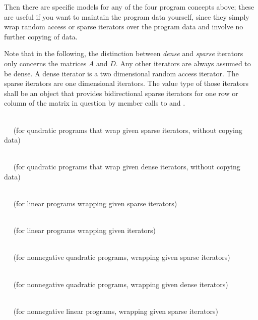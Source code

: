 Then there are specific models for any of the four program concepts above; 
these are useful if you want to maintain the program data yourself, since
they simply wrap random access or sparse iterators over the program data and involve
no further copying of data.

Note that in the following, the distinction between \emph{dense} and \emph{sparse}
iterators only concerns the matrices $A$ and $D$. Any other iterators are always
assumed to be dense. A dense iterator is a two dimensional random access iterator.
The sparse iterators are one dimensional iterators. The value type of those iterators
 shall be an object that provides bidirectional sparse iterators
  for one row or column of the matrix in question
  by member calls to  and .

\\
$\quad$ (for quadratic programs that wrap given sparse iterators, without copying 
data) 

\\
$\quad$ (for quadratic programs that wrap given dense iterators, without copying 
data) 

\\
$\quad$ (for linear programs wrapping given sparse iterators) 

\\
$\quad$ (for linear programs wrapping given iterators) 

\\
$\quad$ (for nonnegative quadratic programs, wrapping given sparse iterators)

\\
$\quad$ (for nonnegative quadratic programs, wrapping given dense iterators)

\\
$\quad$ (for nonnegative linear programs, wrapping given sparse iterators)

